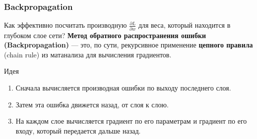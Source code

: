 \documentclass[notheorems, handout]{beamer}
\begin{document}
\begin{frame}
    \frametitle{Backpropagation}
    Как эффективно посчитать производную $\frac{\partial L}{\partial w}$ для веса, который находится в глубоком слое сети?
    \vfill
    \textbf{Метод обратного распространения ошибки (Backpropagation)} --- это, по сути, рекурсивное применение \textbf{цепного правила} (chain rule) из матанализа для вычисления градиентов.
    \vfill
    \begin{block}{Идея}
        \begin{enumerate}
            \item Сначала вычисляется производная ошибки по выходу последнего слоя.
            \item Затем эта ошибка движется назад, от слоя к слою.
            \item На каждом слое вычисляется градиент по его параметрам и градиент по его входу, который передается дальше назад.
        \end{enumerate}
    \end{block}
\end{frame}
\end{document}

